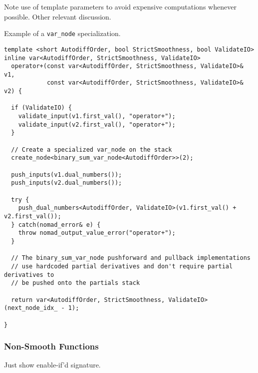 Note use of template parameters to avoid expensive computations
whenever possible.  Other relevant discussion.

Example of a \verb|var_node| specialization.

\begin{verbatim}
template <short AutodiffOrder, bool StrictSmoothness, bool ValidateIO>
inline var<AutodiffOrder, StrictSmoothness, ValidateIO>
  operator+(const var<AutodiffOrder, StrictSmoothness, ValidateIO>& v1,
            const var<AutodiffOrder, StrictSmoothness, ValidateIO>& v2) {

  if (ValidateIO) {
    validate_input(v1.first_val(), "operator+");
    validate_input(v2.first_val(), "operator+");
  }
      
  // Create a specialized var_node on the stack
  create_node<binary_sum_var_node<AutodiffOrder>>(2);
    
  push_inputs(v1.dual_numbers());
  push_inputs(v2.dual_numbers());
    
  try {
    push_dual_numbers<AutodiffOrder, ValidateIO>(v1.first_val() + v2.first_val());
  } catch(nomad_error& e) {
    throw nomad_output_value_error("operator+");
  }
    
  // The binary_sum_var_node pushforward and pullback implementations
  // use hardcoded partial derivatives and don't require partial derivatives to 
  // be pushed onto the partials stack
    
  return var<AutodiffOrder, StrictSmoothness, ValidateIO>(next_node_idx_ - 1);
    
}
\end{verbatim}

\subsubsection{Non-Smooth Functions}

Just show enable-if'd signature.

